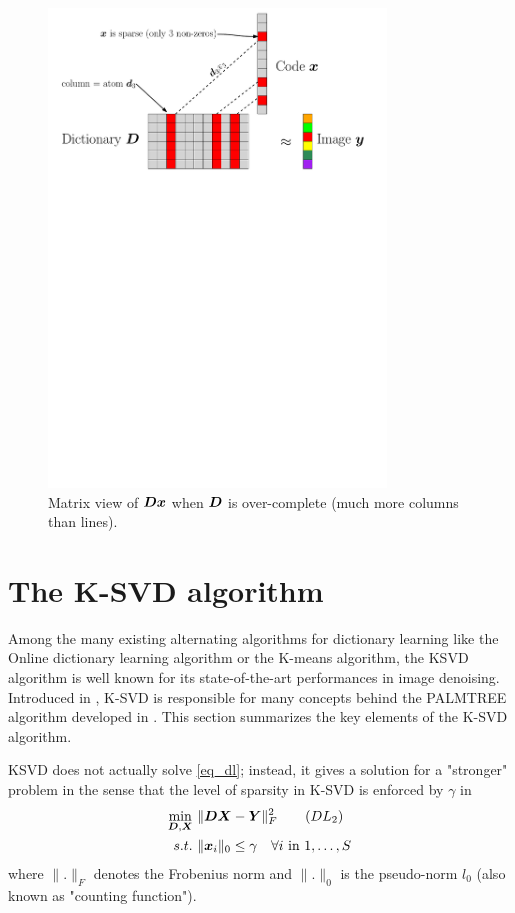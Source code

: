 \begin{figure}[!ht] \centering
\includegraphics[width=0.80\textwidth]{figures/sparsity-matrix.pdf}
\caption{Matrix view of $\bm{D}\bm{x}$ when $\bm{D}$ is over-complete (much more columns than lines).}\label{fig_overcomplete_matrix}
\end{figure}



\section{The K-SVD algorithm}

Among the many existing alternating algorithms for dictionary learning like the Online dictionary learning algorithm or the K-means algorithm, the \ac{KSVD} algorithm is well known for its state-of-the-art performances in image denoising. Introduced in \cite{aharon_k-svd:_2006}, K-SVD is responsible for many concepts behind the PALMTREE algorithm developed in \cite{chabiron_optimization_2016}. This section summarizes the key elements of the K-SVD algorithm.

\ac{KSVD} does not actually solve \eqref{eq_dl}; instead, it gives a solution for a "stronger" problem in the sense that the level of sparsity in K-SVD is enforced by $\gamma$ in
\begin{align*}
\underset{\bm{D},\bm{X}}{\min}~ & \lVert \bm{D}\bm{X}-\bm{Y} \rVert^2_F \tag{$DL_2$}\label{eq_dl_ksvd} \\
s.t.~& \lVert \bm{x}_i \rVert_0 \le \gamma \quad \forall i \text{ in } 1,\dots,S
\end{align*}
where $\lVert . \rVert_F$ denotes the Frobenius norm and $\lVert . \rVert_0$ is the pseudo-norm $l_0$ (also known as "counting function").

